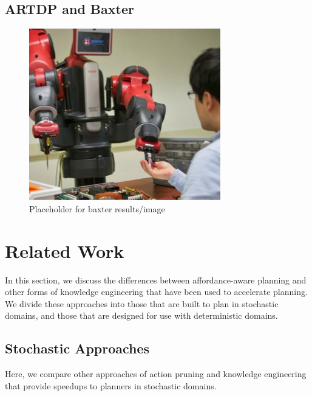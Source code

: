 \documentclass[letterpaper]{article}
\newcommand{\dnote}[1]{\textcolor{Green}{\textbf{}}}
\begin{document}
\subsection{ARTDP and Baxter}

\dnote{Insert description of baxter stuff here}

\dnote{Experiments not yet finished}

\begin{figure}[H]
\centering
\includegraphics[scale=0.195]{figures/baxter_temp.jpg}%
  \caption{Placeholder for baxter results/image}
  \label{fig:baxter_results}
\end{figure}

\section{Related Work}
\label{sec:related-work}

In this section, we discuss the differences between
affordance-aware planning and other forms of knowledge engineering that
have been used to accelerate planning. We divide these approaches
into those that are built to plan in stochastic domains, and those that are
designed for use with deterministic domains.

\subsection{Stochastic Approaches}

Here, we compare other approaches of action pruning and
knowledge engineering that provide speedups to planners
in stochastic domains.

\end{document}
